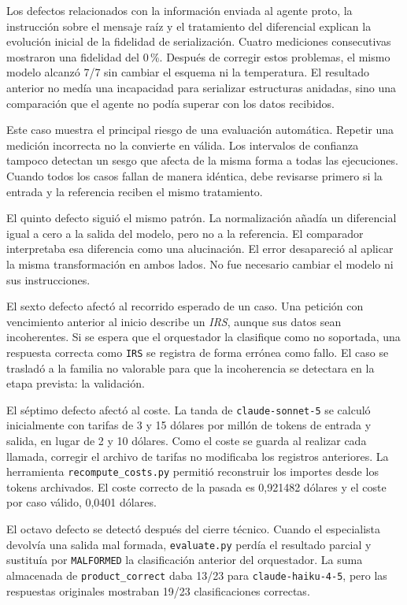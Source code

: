 Los defectos relacionados con la información enviada al agente proto, la instrucción sobre el mensaje raíz y el tratamiento del diferencial explican la evolución inicial de la fidelidad de serialización. Cuatro mediciones consecutivas mostraron una fidelidad del 0\,\%. Después de corregir estos problemas, el mismo modelo alcanzó 7/7 sin cambiar el esquema ni la temperatura. El resultado anterior no medía una incapacidad para serializar estructuras anidadas, sino una comparación que el agente no podía superar con los datos recibidos.

Este caso muestra el principal riesgo de una evaluación automática. Repetir una medición incorrecta no la convierte en válida. Los intervalos de confianza tampoco detectan un sesgo que afecta de la misma forma a todas las ejecuciones. Cuando todos los casos fallan de manera idéntica, debe revisarse primero si la entrada y la referencia reciben el mismo tratamiento.

El quinto defecto siguió el mismo patrón. La normalización añadía un diferencial igual a cero a la salida del modelo, pero no a la referencia. El comparador interpretaba esa diferencia como una alucinación. El error desapareció al aplicar la misma transformación en ambos lados. No fue necesario cambiar el modelo ni sus instrucciones.

El sexto defecto afectó al recorrido esperado de un caso. Una petición con vencimiento anterior al inicio describe un \textit{IRS}, aunque sus datos sean incoherentes. Si se espera que el orquestador la clasifique como no soportada, una respuesta correcta como \texttt{IRS} se registra de forma errónea como fallo. El caso se trasladó a la familia no valorable para que la incoherencia se detectara en la etapa prevista: la validación.

El séptimo defecto afectó al coste. La tanda de \texttt{claude-sonnet-5} se calculó inicialmente con tarifas de 3 y 15 dólares por millón de tokens de entrada y salida, en lugar de 2 y 10 dólares. Como el coste se guarda al realizar cada llamada, corregir el archivo de tarifas no modificaba los registros anteriores. La herramienta \texttt{recompute\_costs.py} permitió reconstruir los importes desde los tokens archivados. El coste correcto de la pasada es 0,921482 dólares y el coste por caso válido, 0,0401 dólares.

El octavo defecto se detectó después del cierre técnico. Cuando el especialista devolvía una salida mal formada, \texttt{evaluate.py} perdía el resultado parcial y sustituía por \texttt{MALFORMED} la clasificación anterior del orquestador. La suma almacenada de \texttt{product\_correct} daba 13/23 para \texttt{claude-haiku-4-5}, pero las respuestas originales mostraban 19/23 clasificaciones correctas.

